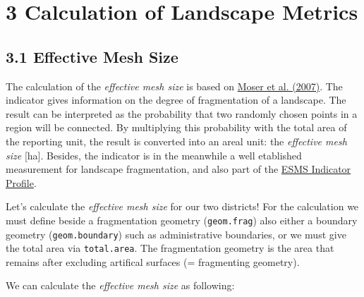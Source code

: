 \documentclass[]{article}
\newenvironment{Shaded}{\begin{snugshade}}{\end{snugshade}}
\newcommand{\KeywordTok}[1]{\textcolor[rgb]{0.13,0.29,0.53}{\textbf{#1}}}
\newcommand{\DataTypeTok}[1]{\textcolor[rgb]{0.13,0.29,0.53}{#1}}
\newcommand{\DecValTok}[1]{\textcolor[rgb]{0.00,0.00,0.81}{#1}}
\newcommand{\StringTok}[1]{\textcolor[rgb]{0.31,0.60,0.02}{#1}}
\newcommand{\CommentTok}[1]{\textcolor[rgb]{0.56,0.35,0.01}{\textit{#1}}}
\newcommand{\OtherTok}[1]{\textcolor[rgb]{0.56,0.35,0.01}{#1}}
\newcommand{\OperatorTok}[1]{\textcolor[rgb]{0.81,0.36,0.00}{\textbf{#1}}}
\newcommand{\NormalTok}[1]{#1}
\begin{document}
\section{3 Calculation of Landscape
Metrics}\label{calculation-of-landscape-metrics}

\subsection{3.1 Effective Mesh Size}\label{effective-mesh-size}

The calculation of the \emph{effective mesh size} is based on
\href{https://doi.org/10.1007/s10980-006-9023-0}{Moser et al. (2007)}.
The indicator gives information on the degree of fragmentation of a
landscape. The result can be interpreted as the probability that two
randomly chosen points in a region will be connected. By multiplying
this probability with the total area of the reporting unit, the result
is converted into an areal unit: the \emph{effective mesh size}
{[}ha{]}. Besides, the indicator is in the meanwhile a well etablished
measurement for landscape fragmentation, and also part of the
\href{https://ec.europa.eu/eurostat/en/web/products-datasets/-/T2020_RN110}{ESMS
Indicator Profile}.

Let's calculate the \emph{effective mesh size} for our two districts!
For the calculation we must define beside a fragmentation geometry
(\texttt{geom.frag}) also either a boundary geometry
(\texttt{geom.boundary}) such as administrative boundaries, or we must
give the total area via \texttt{total.area}. The fragmentation geometry
is the area that remains after excluding artifical surfaces (=
fragmenting geometry).

We can calculate the \emph{effective mesh size} as following:

\begin{Shaded}
\end{Shaded}
\end{document}
